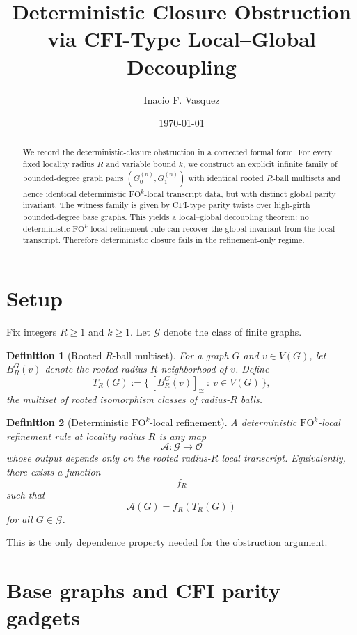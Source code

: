 \documentclass[11pt]{article}
\title{Deterministic Closure Obstruction via CFI-Type Local--Global Decoupling}
\author{Inacio F. Vasquez}
\date{\today}
\newtheorem{definition}{Definition}
\begin{document}
\maketitle

\begin{abstract}
We record the deterministic-closure obstruction in a corrected formal form. For every fixed locality radius \(R\) and variable bound \(k\), we construct an explicit infinite family of bounded-degree graph pairs \((G_0^{(n)},G_1^{(n)})\) with identical rooted \(R\)-ball multisets and hence identical deterministic \(\mathrm{FO}^k\)-local transcript data, but with distinct global parity invariant. The witness family is given by CFI-type parity twists over high-girth bounded-degree base graphs. This yields a local--global decoupling theorem: no deterministic \(\mathrm{FO}^k\)-local refinement rule can recover the global invariant from the local transcript. Therefore deterministic closure fails in the refinement-only regime.
\end{abstract}

\section{Setup}

Fix integers \(R\ge 1\) and \(k\ge 1\). Let \(\mathcal G\) denote the class of finite graphs.

\begin{definition}[Rooted \(R\)-ball multiset]
For a graph \(G\) and \(v\in V(G)\), let \(B_R^G(v)\) denote the rooted radius-\(R\) neighborhood of \(v\). Define
\[
T_R(G):=\big\{\,[B_R^G(v)]_{\cong}\ :\ v\in V(G)\,\big\},
\]
the multiset of rooted isomorphism classes of radius-\(R\) balls.
\end{definition}

\begin{definition}[Deterministic \(\mathrm{FO}^k\)-local refinement]
A deterministic \(\mathrm{FO}^k\)-local refinement rule at locality radius \(R\) is any map
\[
\mathcal A:\mathcal G\to \mathcal O
\]
whose output depends only on the rooted radius-\(R\) local transcript. Equivalently, there exists a function
\[
f_R
\]
such that
\[
\mathcal A(G)=f_R(T_R(G))
\]
for all \(G\in\mathcal G\).
\end{definition}

This is the only dependence property needed for the obstruction argument.

\section{Base graphs and CFI parity gadgets}
\end{document}
